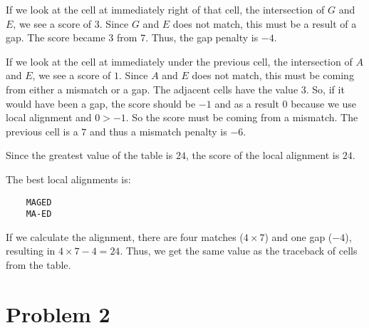 \documentclass[12pt]{article}
\begin{document}
 If we look at the cell at immediately right of that cell, the intersection 
    of $G$ and $E$, we see a score of $3$. Since $G$ and $E$ does not 
    match, this must be a result of a gap. The score became $3$ from
    $7$. Thus, the gap penalty is $-4$.
 
 If we look at the cell at immediately under the previous cell, the
    intersection of $A$ and $E$, we see a score of $1$. Since $A$ and 
    $E$ does not match, this must be coming from either a mismatch or 
    a gap. The adjacent cells have the value $3$. So, if it would have 
    been a gap, the score should be $-1$ and as a result $0$ because 
    we use local alignment and $0>-1$. So the score must be coming 
    from a mismatch. The previous cell is a $7$ and thus a mismatch 
    penalty is $-6$.
    
Since the greatest value of the table is $24$, the score of the 
    local alignment is $24$.
    
The best local alignments is:
\begin{verbatim}
    MAGED
    MA-ED
\end{verbatim}
If we calculate the alignment, there are four matches ($4\times 7$) and one 
    gap ($-4$), resulting in $4\times7-4=24$. Thus, we get the same value as 
    the traceback of cells from the table.
\section*{Problem 2}
\end{document}
